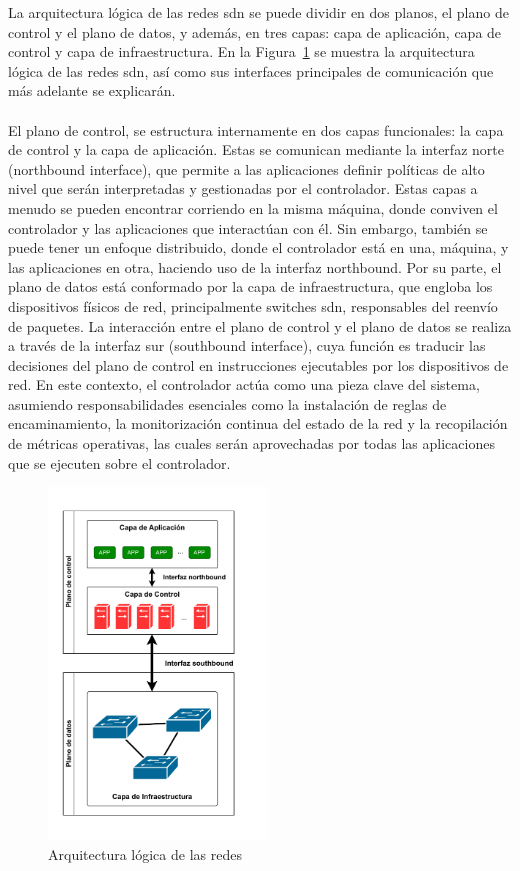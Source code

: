 La arquitectura lógica de las redes \gls{sdn} se puede dividir en dos planos, el plano de control y el plano de datos, y además, en tres capas: capa de aplicación, capa de control y capa de infraestructura. En la Figura~\ref{fig:sdn_architecture} se muestra la arquitectura lógica de las redes \gls{sdn}, así como sus interfaces principales de comunicación que más adelante se explicarán.\\
\\
El plano de control, se estructura internamente en dos capas funcionales: la capa de control y la capa de aplicación. Estas se comunican mediante la interfaz norte (northbound interface), que permite a las aplicaciones definir políticas de alto nivel que serán interpretadas y gestionadas por el controlador. Estas capas a menudo se pueden encontrar corriendo en la misma máquina, donde conviven el controlador y las aplicaciones que interactúan con él. Sin embargo, también se puede tener un enfoque distribuido, donde el controlador está en una, máquina, y las aplicaciones en otra, haciendo uso de la interfaz northbound. Por su parte, el plano de datos está conformado por la capa de infraestructura, que engloba los dispositivos físicos de red, principalmente switches \gls{sdn}, responsables del reenvío de paquetes. La interacción entre el plano de control y el plano de datos se realiza a través de la interfaz sur (southbound interface), cuya función es traducir las decisiones del plano de control en instrucciones ejecutables por los dispositivos de red. En este contexto, el controlador actúa como una pieza clave del sistema, asumiendo responsabilidades esenciales como la instalación de reglas de encaminamiento, la monitorización continua del estado de la red y la recopilación de métricas operativas, las cuales serán aprovechadas por todas las aplicaciones que se ejecuten sobre el controlador.

\begin{figure}[ht!]
\centering
\includegraphics[width=0.52\textwidth]{fig/02_sota/sota_2_sdn_arch_b.drawio.pdf}
\caption{Arquitectura lógica de las redes }
\label{fig:sdn_architecture}
\end{figure}

